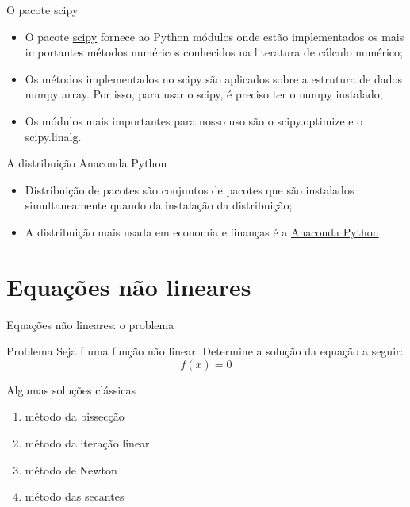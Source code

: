 \documentclass{beamer}
\begin{document}
\begin{frame}{O pacote scipy}
	\begin{itemize}
		\item O pacote \href{https://www.scipy.org/}{scipy} fornece ao Python módulos onde estão implementados os mais importantes métodos numéricos conhecidos na literatura de cálculo numérico;
		\item Os métodos implementados no scipy são aplicados sobre a estrutura de dados numpy array.  Por isso, para usar o scipy, é preciso ter o numpy instalado;
		\item Os módulos mais importantes para nosso uso são o scipy.optimize e o scipy.linalg.
	\end{itemize}
\end{frame}
	
\begin{frame}{A distribuição Anaconda Python}
	\begin{itemize}
		 \item Distribuição de pacotes são conjuntos de pacotes que são instalados simultaneamente quando da instalação da distribuição;
		  
		 \item A distribuição mais usada em economia e finanças é a \href{https://anaconda.org/anaconda/python}{Anaconda Python} 
	\end{itemize}
\end{frame}	
	
	
	
\section{Equações não lineares}



	\begin{frame}{Equações não lineares: o problema}
		\begin{block}{Problema}
			Seja f uma função não linear.  Determine a solução da equação a seguir:
			\begin{equation*}
				f(x) = 0
			\end{equation*}
		\end{block}
		
	\end{frame}
	
	\begin{frame}{Algumas soluções clássicas}
		\begin{enumerate}
			\item método da bissecção
			\item método da iteração linear
			\item método de Newton
			\item método das secantes
		\end{enumerate}
	\end{frame}
	
\end{document}
